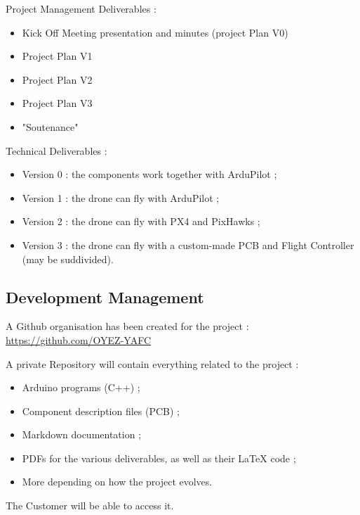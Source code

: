 \documentclass{beamer}
\begin{document}
\begin{frame}
    \begin{minipage}{0.48\textwidth}
        Project Management Deliverables :
        \begin{itemize}
            \item Kick Off Meeting presentation and minutes (project Plan V0)
            \item Project Plan V1
            \item Project Plan V2
            \item Project Plan V3
            \item "Soutenance"
        \end{itemize}
    \end{minipage}
    \hfill
    \begin{minipage}{0.48\textwidth}
        Technical Deliverables :
        \begin{itemize}
            \item Version 0 : the components work together with ArduPilot ;
            \item Version 1 : the drone can fly with ArduPilot ;
            \item Version 2 : the drone can fly with PX4 and PixHawks ;
            \item Version 3 : the drone can fly with a custom-made PCB and Flight Controller (may be suddivided).
        \end{itemize}
    \end{minipage}
\end{frame}


\subsection{Development Management}
\begin{frame}
    A Github organisation has been created for the project : \href{https://github.com/OYEZ-YAFC}{https://github.com/OYEZ-YAFC}

    \vspace*{10mm}

    A private Repository will contain everything related to the project :
    \begin{itemize}
        \item Arduino programs (C++) ;
        \item Component description files (PCB) ;
        \item Markdown documentation ;
        \item PDFs for the various deliverables, as well as their LaTeX code ;
        \item More depending on how the project evolves.
    \end{itemize}
    
    \vspace*{5mm}

    The Customer will be able to access it.
\end{frame}
\end{document}
